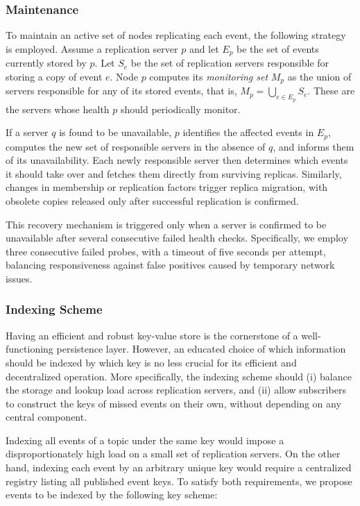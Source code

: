 \subsubsection{Maintenance}

To maintain an active set of nodes replicating each event, the following strategy is employed. 
Assume a replication server $p$ and let $E_p$ be the set of events currently stored by $p$. 
Let $S_e$ be the set of replication servers responsible for storing a copy of event $e$. 
Node $p$ computes its \emph{monitoring set} $M_p$ as the union of servers responsible for any of its stored events, that is, $M_p = \bigcup_{e \in E_p} S_e$. 
These are the servers whose health $p$ should periodically monitor.

If a server $q$ is found to be unavailable, $p$ identifies the affected events in $E_p$, computes the new set of responsible servers in the absence of $q$, and informs them of its unavailability. 
Each newly responsible server then determines which events it should take over and fetches them directly from surviving replicas. 
Similarly, changes in membership or replication factors trigger replica migration, with obsolete copies released only after successful replication is confirmed.

This recovery mechanism is triggered only when a server is confirmed to be unavailable after several consecutive failed health checks. 
Specifically, we employ three consecutive failed probes, with a timeout of five seconds per attempt, balancing responsiveness against false positives caused by temporary network issues.

\subsubsection{Indexing Scheme}
\label{sec:indexing-scheme}

Having an efficient and robust key-value store is the cornerstone of a well-functioning persistence layer. 
However, an educated choice of which information should be indexed by which key is no less crucial for its efficient and decentralized operation.
More specifically, the indexing scheme should (i) balance the storage and lookup load across replication servers, and (ii) allow subscribers to construct the keys of missed events on their own, without depending on any central component.

Indexing all events of a topic under the same key would impose a disproportionately high load on a small set of replication servers.
On the other hand, indexing each event by an arbitrary unique key would require a centralized registry listing all published event keys.
To satisfy both requirements, we propose events to be indexed by the following key scheme:

